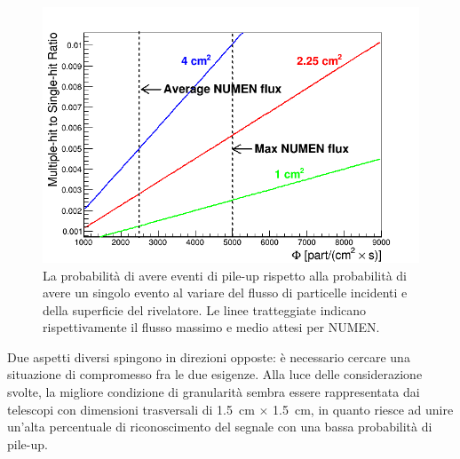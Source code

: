 \begin{figure} [!t]
	\centering
	\includegraphics[scale=0.55]{Grafici_Tesi2/Granularita/pile-up3.png}
	\caption{La probabilità di avere eventi di pile-up rispetto alla probabilità di avere un singolo evento al variare del flusso di particelle incidenti e della superficie del rivelatore. Le linee tratteggiate indicano rispettivamente il flusso massimo e medio attesi per NUMEN.} \label{fig:pile-up}
\end{figure}


Due aspetti diversi spingono in direzioni opposte: è necessario cercare una situazione di compromesso fra le due esigenze.
Alla luce delle considerazione svolte, la migliore condizione di granularità sembra essere rappresentata dai telescopi con dimensioni trasversali di 1.5~cm $\times$ 1.5~cm, in quanto riesce ad unire un'alta percentuale di riconoscimento del segnale con una bassa probabilità di pile-up.












